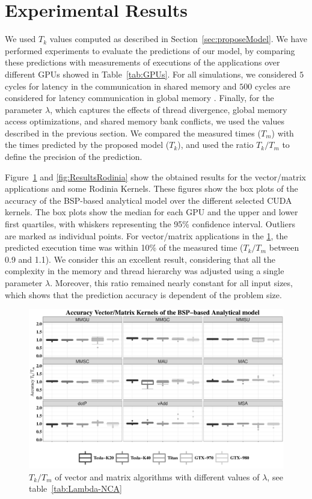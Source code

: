 \section{Experimental Results}\label{sec:resultModel}

We used $T_k$ values computed as described in Section~\ref{sec:proposeModel}. We have performed experiments to evaluate the predictions of our model, by comparing these predictions with measurements of executions of the applications over different GPUs showed in Table~\ref{tab:GPUs}. For all simulations, we considered $5$ cycles for latency in the communication in shared memory and $500$ cycles are considered for latency communication in global memory \citep{CUDA:Best}. Finally, for the parameter $\lambda$, which captures the effects of thread divergence, global memory access optimizations, and shared memory bank conflicts, we used the values described in the previous section. We compared the measured times ($T_m$) with the times predicted by the proposed model ($T_k$), and used the ratio $T_k/T_m$ to define the precision of the prediction. 

Figure~\ref{fig:resultsVMApp} and \ref{fig:ResultsRodinia} show the obtained results for the vector/matrix applications and some Rodinia Kernels. These figures show the box plots of the accuracy of the BSP-based analytical model over the different selected CUDA kernels. The box plots show the median for each GPU and the upper and lower first quartiles, with whiskers representing the 95\% confidence interval. Outliers are marked as individual points. For vector/matrix applications in the \ref{fig:resultsVMApp}, the predicted execution time was within 10\% of the measured time ($T_k/T_m$ between 0.9 and 1.1). We consider this an excellent result, considering that all the complexity in the memory and thread hierarchy was adjusted using a single parameter $\lambda$. Moreover, this ratio remained nearly constant for all input sizes, which shows that the prediction accuracy is dependent of the problem size.

\begin{figure}[htpb]
\centering
 \includegraphics[scale=.4]{./images/ResutAnalyticalModel.pdf}
\caption{$T_k/T_m$  of vector and matrix algorithms with different values of $\lambda$, see table~\ref{tab:Lambda-NCA}}
\label{fig:resultsVMApp}
\end{figure}


